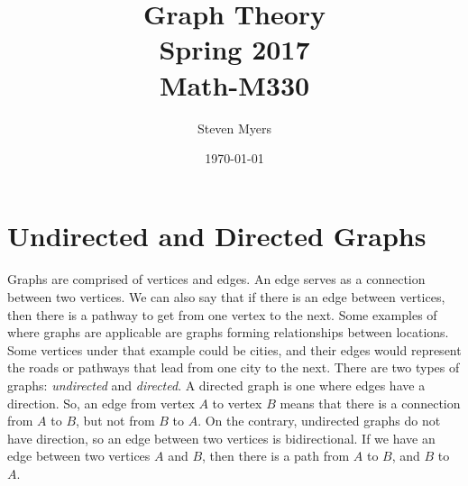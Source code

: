 \documentclass{article}
\begin{document}
\title{Graph Theory\\ Spring 2017\\ Math-M330}         %
\author{Steven Myers}        %
\date{\today}          %
\maketitle


\makeatother     %

\pagestyle{plain}

\section*{Undirected and Directed Graphs}

\paragraph{}
Graphs are comprised of vertices and edges. An edge serves as a connection between two vertices. We can also say that if there is an edge between vertices, then there is a pathway to get from one vertex to the next. Some examples of where graphs are applicable are graphs forming relationships between locations. Some vertices under that example could be cities, and their edges would represent the roads or pathways that lead from one city to the next. There are two types of graphs: \textit{undirected} and \textit{directed}. A directed graph is one where edges have a direction. So, an edge from vertex $A$ to vertex $B$ means that there is a connection from $A$ to $B$, but not from $B$ to $A$. On the contrary, undirected graphs do not have direction, so an edge between two vertices is bidirectional. If we have an edge between two vertices $A$ and $B$, then there is a path from $A$ to $B$, and $B$ to $A$.\\
\end{document}
